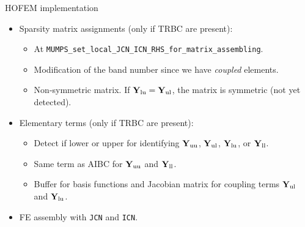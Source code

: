 \begin{frame}[allowframebreaks]{HOFEM implementation}
\begin{itemize}
    \framebreak

    \item Sparsity matrix assignments (only if TRBC are present):
    \begin{itemize}
      \item At \texttt{MUMPS\_set\_local\_JCN\_ICN\_RHS\_for\_matrix\_assembling}.
      \item Modification of the band number since we have \emph{coupled} elements.
      \item Non-symmetric matrix. \alert{If $\vec{Y}_{\rm lu} = \vec{Y}_{\rm ul}$, the matrix is symmetric (not yet detected).}
    \end{itemize}   
    \item Elementary terms (only if TRBC are present):
    \begin{itemize}
      \item Detect if lower or upper for identifying $\vec{Y}_{\rm uu}$, $\vec{Y}_{\rm ul}$, $\vec{Y}_{\rm lu}$, or $\vec{Y}_{\rm ll}$.
      \item Same term as AIBC for $\vec{Y}_{\rm uu}$ and $\vec{Y}_{\rm ll}$.
      \item Buffer for basis functions and Jacobian matrix for coupling terms $\vec{Y}_{\rm ul}$ and $\vec{Y}_{\rm lu}$.
    \end{itemize}
    \item FE assembly with \texttt{JCN} and \texttt{ICN}.
  \end{itemize}
\end{frame}
